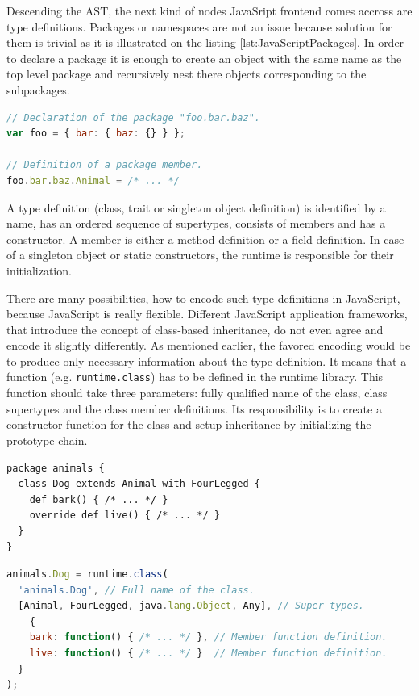 \documentclass[12pt,a4paper]{report}
\begin{document}
Descending the AST, the next kind of nodes JavaSript frontend comes accross are type definitions. Packages or namespaces are not an issue because solution for them is trivial as it is illustrated on the listing \ref{lst:JavaScriptPackages}. In order to declare a package it is enough to create an object with the same name as the top level package and recursively nest there objects corresponding to the subpackages.

\begin{lstlisting}[language=JavaScript,caption={Packages in JavaScript.},label={lst:JavaScriptPackages}]
// Declaration of the package "foo.bar.baz".
var foo = { bar: { baz: {} } };

// Definition of a package member.
foo.bar.baz.Animal = /* ... */
\end{lstlisting}

A type definition (class, trait or singleton object definition) is identified by a name, has an ordered sequence of supertypes, consists of members and has a constructor. A member is either a method definition or a field definition. In case of a singleton object or static constructors, the runtime is responsible for their initialization.

There are many possibilities, how to encode such type definitions in JavaScript, because JavaScript is really flexible. Different JavaScript application frameworks, that introduce the concept of class-based inheritance, do not even agree and encode it slightly differently. As mentioned earlier, the favored encoding would be to produce only necessary information about the type definition. It means that a function (e.g. \texttt{runtime.class}) has to be defined in the runtime library. This function should take three parameters: fully qualified name of the class, class supertypes and the class member definitions. Its responsibility is to create a constructor function for the class and setup inheritance by initializing the prototype chain. 

\begin{lstlisting}[caption={Scala \texttt{Dog} class example.},label={lst:ScalaClassEncoding}]
package animals {
  class Dog extends Animal with FourLegged {
    def bark() { /* ... */ }
    override def live() { /* ... */ }
  }
}
\end{lstlisting}

\begin{lstlisting}[language=JavaScript,caption={The \texttt{Dog} class encoded using the \texttt{runtime.class} function},label={lst:JavaScriptClassEncoding}]
animals.Dog = runtime.class(
  'animals.Dog', // Full name of the class.                              
  [Animal, FourLegged, java.lang.Object, Any], // Super types.
	{
    bark: function() { /* ... */ }, // Member function definition.
    live: function() { /* ... */ }  // Member function definition.
  }
);
\end{lstlisting}
\end{document}
